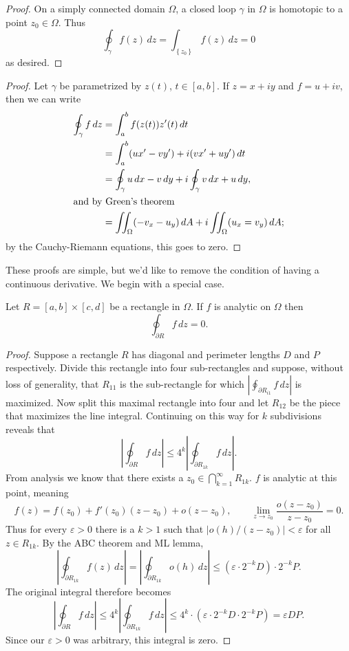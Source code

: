 \documentclass[../m136main.tex]{subfiles}
\begin{document}
\begin{proof}
    On a simply connected domain $\Omega$, a closed loop $\gamma$ in $\Omega$ is homotopic to a point $z_0 \in \Omega$.
    Thus
    \[ \oint_\gamma f(z) \,dz = \int_{\left\{ z_0 \right\}} f(z) \,dz = 0 \]
    as desired. 
\end{proof}

\begin{proof}
    Let $\gamma$ be parametrized by $z(t)$, $t \in [a,b]$.
    If $z = x + iy$ and $f = u + iv$, then we can write
    \begin{align*}
        \oint_\gamma f \,dz &= \int_a^b f(z(t)) z'(t) \,dt \\
        &= \int_a^b (ux' - vy') + i(vx' + uy') \,dt \\
        &= \oint_\gamma u \,dx - v \,dy + i \oint_\gamma v \,dx + u\,dy, \\
        \intertext{and by Green's theorem}
        &= \iint_\Omega (-v_x - u_y) \,dA + i \iint_\Omega (u_x = v_y) \,dA;
    \end{align*}
    by the Cauchy-Riemann equations, this goes to zero.
\end{proof}

These proofs are simple, but we'd like to remove the condition of having a continuous derivative.
We begin with a special case.

\begin{lemma}[]
    Let $R = [a,b] \times [c,d]$ be a rectangle in $\Omega$.
    If $f$ is analytic on $\Omega$ then
    \[ \oint_{\partial R} f \,dz = 0. \]
\end{lemma}

\begin{proof}
    Suppose a rectangle $R$ has diagonal and perimeter lengths $D$ and $P$ respectively.
    Divide this rectangle into four sub-rectangles and suppose, without loss of generality, that $R_{11}$ is the sub-rectangle for which $\left| \oint_{\partial R_{i1}} f \,dz \right|$ is maximized.
    Now split this maximal rectangle into four and let $R_{12}$ be the piece that maximizes the line integral.
    Continuing on this way for $k$ subdivisions reveals that
    \[ \left| \oint_{\partial R} f\,dz \right| \leq 4^{k} \left| \oint_{\partial R_{1k}} f\,dz \right|. \]
    From analysis we know that there exists a $z_0 \in \bigcap_{k=1}^\infty R_{1k}$.
    $f$ is analytic at this point, meaning
    \[ f(z) = f(z_0) + f'(z_0) (z - z_0) + o(z - z_0), \qquad \lim_{z \to z_0} \frac{o(z - z_0)}{z - z_0} = 0. \]
    Thus for every $\varepsilon > 0$ there is a $k > 1$ such that $|o(h) / (z - z_0)| < \varepsilon$ for all $z \in R_{1k}$.
    By the ABC theorem and ML lemma,
    \[ \left| \oint_{\partial R_{1k}} f(z) \,dz \right| = \left| \oint_{\partial R_{1k}} o(h) \,dz \right| \leq (\varepsilon \cdot 2^{-k} D) \cdot 2^{-k} P. \]
    The original integral therefore becomes
    \[ \left| \oint_{\partial R} f\,dz \right| \leq 4^{k} \left| \oint_{\partial R_{1k}} f\,dz \right| \leq 4^{k} \cdot (\varepsilon \cdot 2^{-k} D \cdot 2^{-k} P) = \varepsilon DP. \]
    Since our $\varepsilon > 0$ was arbitrary, this integral is zero.
\end{proof}
\end{document}
